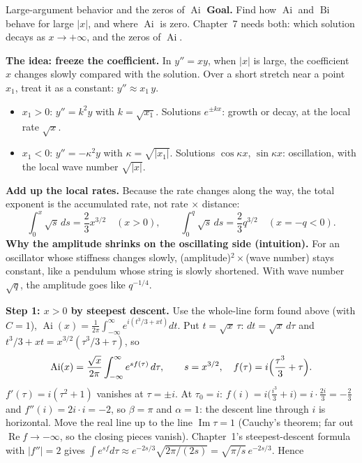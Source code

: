 \documentclass[11pt]{beamer}
\providecommand{\Ai}{\operatorname{Ai}}
\providecommand{\Bi}{\operatorname{Bi}}
\begin{document}
\begin{frame}[allowframebreaks=1.00]{Large-argument behavior and the zeros of $\Ai$}
\footnotesize
\textbf{Goal.} Find how \(\Ai\) and \(\Bi\) behave for large \(|x|\), and where \(\Ai\) is zero. Chapter~7 needs
both: which solution decays as \(x\to+\infty\), and the zeros of \(\Ai\).

\textbf{The idea: freeze the coefficient.} In \(y''=xy\), when \(|x|\) is large, the coefficient \(x\) changes
slowly compared with the solution. Over a short stretch near a point \(x_1\), treat it as a constant:
\(y''\approx x_1\,y\).
\begin{itemize}
  \item \(x_1>0\): \(y''=k^2y\) with \(k=\sqrt{x_1}\). Solutions \(e^{\pm kx}\): growth or decay, at the local
        rate \(\sqrt x\).
  \item \(x_1<0\): \(y''=-\kappa^2y\) with \(\kappa=\sqrt{|x_1|}\). Solutions \(\cos\kappa x\), \(\sin\kappa x\):
        oscillation, with the local wave number \(\sqrt{|x|}\).
\end{itemize}
\textbf{Add up the local rates.} Because the rate changes along the way, the total exponent is the
accumulated rate, not rate \(\times\) distance:
\[
 \int_0^x\sqrt s\,ds=\frac23x^{3/2}\quad(x>0),\qquad
 \int_0^q\sqrt s\,ds=\frac23q^{3/2}\quad(x=-q<0).
\]
\textbf{Why the amplitude shrinks on the oscillating side (intuition).} For an oscillator whose
stiffness changes slowly, (amplitude)\(^2\times\)(wave number) stays constant, like a pendulum whose
string is slowly shortened. With wave number \(\sqrt q\), the amplitude goes like \(q^{-1/4}\).
\par\framebreak\par
\textbf{Step 1: \(x>0\) by steepest descent.} Use the whole-line form found above (with \(C=1\)),
\(\Ai(x)=\frac1{2\pi}\int_{-\infty}^{\infty}e^{i(t^3/3+xt)}dt\). Put \(t=\sqrt x\,\tau\): \(dt=\sqrt x\,d\tau\) and \(t^3/3+xt=x^{3/2}(\tau^3/3+\tau)\), so
\[
 \Ai(x)=\frac{\sqrt x}{2\pi}\int_{-\infty}^{\infty}e^{sf(\tau)}\,d\tau,\qquad s=x^{3/2},\quad f(\tau)=i\Bigl(\frac{\tau^3}{3}+\tau\Bigr).
\]
\(f'(\tau)=i(\tau^2+1)\) vanishes at \(\tau=\pm i\). At \(\tau_0=i\): \(f(i)=i\bigl(\frac{i^3}3+i\bigr)=i\cdot\frac{2i}3=-\frac23\) and
\(f''(i)=2i\cdot i=-2\), so \(\beta=\pi\) and \(\alpha=1\): the descent line through \(i\) is horizontal. Move the real line up to
the line \(\operatorname{Im}\tau=1\) (Cauchy's theorem; far out \(\operatorname{Re}f\to-\infty\), so the closing pieces vanish). Chapter~1's
steepest-descent formula with \(|f''|=2\) gives \(\int e^{sf}d\tau\approx e^{-2s/3}\sqrt{2\pi/(2s)}=\sqrt{\pi/s}\,e^{-2s/3}\). Hence

\end{frame}
\end{document}
